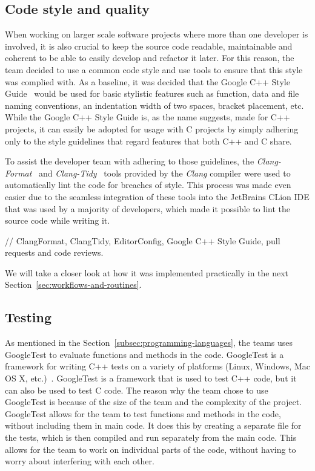 \subsection{Code style and quality}\label{subsec:code-style-and-quality}

When working on larger scale software projects where more than one developer is involved, it is also crucial to keep the
source code readable, maintainable and coherent to be able to easily develop and refactor it later.
For this reason, the team decided to use a common code style and use tools to ensure that this style was complied with.
As a baseline, it was decided that the Google C++ Style Guide~\cite{google-style} would be used for basic stylistic
features such as function, data and file naming conventions, an indentation width of two spaces, bracket placement, etc.
While the Google C++ Style Guide is, as the name suggests, made for C++ projects, it can easily be adopted for usage
with C projects by simply adhering only to the style guidelines that regard features that both C++ and C share.

To assist the developer team with adhering to those guidelines, the \textit{Clang-Format}~\cite{clang-format} and
\textit{Clang-Tidy}~\cite{clang-tidy} tools provided by the \textit{Clang} compiler were used to automatically lint
the code for breaches of style.
This process was made even easier due to the seamless integration of these tools into the JetBrains CLion IDE that was
used by a majority of developers, which made it possible to lint the source code while writing it.

// ClangFormat, ClangTidy, EditorConfig, Google C++ Style Guide, pull requests and code reviews.

We will take a closer look at how it was implemented practically in the next Section~\ref{sec:workflows-and-routines}.

\subsection{Testing}\label{subsec:testing}

As mentioned in the Section~\ref{subsec:programming-languages}, the teams uses GoogleTest to evaluate functions and
methods in the code. GoogleTest is a framework for writing C++ tests on a variety of platforms (Linux, Windows, Mac OS
X, etc.)~\cite{googletest}.
GoogleTest is a framework that is used to test C++ code, but it can also be used to test C code.
The reason why the team chose to use GoogleTest is because of the size of the team and the complexity of the project.
GoogleTest allows for the team to test functions and methods in the code, without including them in main code.
It does this by creating a separate file for the tests, which is then compiled and run separately from the main code.
This allows for the team to work on individual parts of the code, without having to worry about interfering with each
other.

